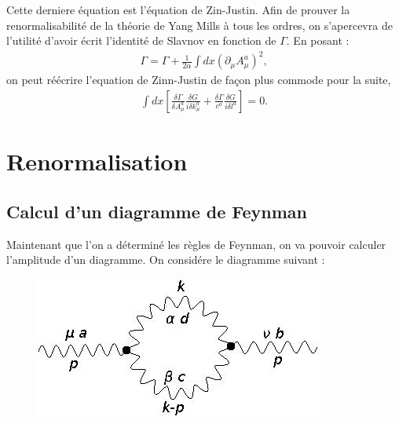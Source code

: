 \documentclass[a4paper,11pt]{article}
\theoremstyle{plain}
\theoremstyle{definition}
\theoremstyle{remark}
\numberwithin{equation}{section}
\numberwithin{equation}{subsection}
\numberwithin{figure}{section}
\begin{document}
Cette derniere équation est l'équation de Zin-Justin. Afin de prouver la renormalisabilité de la théorie de Yang Mills à tous les ordres, 
on s'apercevra de l'utilité d'avoir écrit l'identité de Slavnov en fonction de $\Gamma$.
En posant :
\begin{eqnarray}
 \Gamma = \Gamma + \frac{1}{2 \alpha} \int dx \left( \partial_{\mu} A^{a}_ {\mu} \right)^{2},
\end{eqnarray}
on peut réécrire l'equation de Zinn-Justin de façon plus commode pour la suite,
\begin{eqnarray}
 \int dx \left[ \frac{\delta \Gamma}{\delta A^{a}_{\mu}} \frac{\delta G }{i \delta k^{a}_{\mu}} 
+ \frac{\delta \Gamma}{c^{a}}\frac{\delta G}{i \delta l^{a}} \right] = 0.
\end{eqnarray}

\section{Renormalisation}


\subsection{Calcul d'un diagramme de Feynman}

\noindent
Maintenant que l'on a déterminé les règles de Feynman, on va pouvoir calculer l'amplitude d'un diagramme. On considére le diagramme suivant :
\begin{figure}[H]
 \begin{center}
  \includegraphics[scale=0.4]{1_loop_2_vert_3A.jpg}
 \end{center}
\end{figure}
\end{document}
